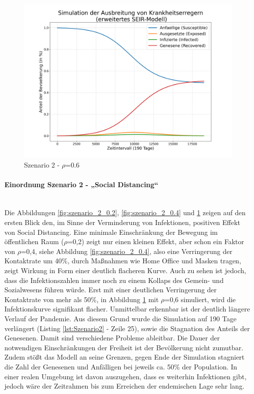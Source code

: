 \documentclass[12pt]{article}
\begin{document}
\begin{figure}[H]
\centering
\includegraphics[scale=0.4]{Szenario_2_rho_0.6}
\caption{Szenario 2 - $\rho$=0.6}
\label{fig:szenario_2_0.6}
\end{figure}

\paragraph{Einordnung Szenario 2 - „Social Distancing“}\mbox{} \\
Die Abbildungen \ref{fig:szenario_2_0.2}, \ref{fig:szenario_2_0.4} und \ref{fig:szenario_2_0.6} zeigen auf den ersten Blick den, im Sinne der Verminderung von Infektionen, positiven Effekt von Social Distancing. Eine minimale Einschränkung der Bewegung im öffentlichen Raum ($\rho$=0,2) zeigt nur einen kleinen Effekt, aber schon ein Faktor von $\rho$=0,4, siehe Abbildung \ref{fig:szenario_2_0.4}, also eine Verringerung der Kontaktrate um 40\%, durch Maßnahmen wie Home Office und Masken tragen, zeigt Wirkung in Form einer deutlich flacheren Kurve. Auch zu sehen ist jedoch, dass die Infektionszahlen immer noch zu einem Kollaps des Gemein- und Sozialwesens führen würde. Erst mit einer deutlichen Verringerung der Kontaktrate von mehr als 50\%, in Abbildung \ref{fig:szenario_2_0.6} mit $\rho$=0,6 simuliert, wird die Infektionskurve signifikant flacher. Unmittelbar erkennbar ist der deutlich längere Verlauf der Pandemie. Aus diesem Grund wurde die Simulation auf 190 Tage verlängert (Listing \ref{lst:Szenario2} - Zeile 25), sowie die Stagnation des Anteils der Genesenen. Damit sind verschiedene Probleme ableitbar. Die Dauer der notwendigen Einschränkungen der Freiheit ist der Bevölkerung nicht zumutbar. Zudem stößt das Modell an seine Grenzen, gegen Ende der Simulation stagniert die Zahl der Genesenen und Anfälligen bei jeweils ca. 50\% der Population. In einer realen Umgebung ist davon auszugehen, dass es weiterhin Infektionen gibt, jedoch wäre der Zeitrahmen bis zum Erreichen der endemischen Lage sehr lang.
\end{document}
